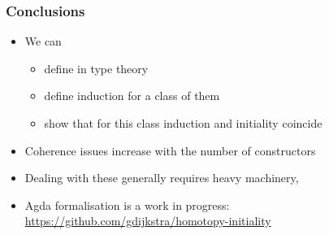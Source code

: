 \documentclass{beamer}
\begin{document}
 \begin{frame}
   \frametitle{Conclusions}
   
   \begin{itemize}
   \item We can
     \begin{itemize}
     \item define \onehits in type theory
     \item define induction for a class of them
     \item show that for this class induction and initiality coincide
     \end{itemize}
   \item Coherence issues increase with the number of constructors
   \item Dealing with these generally requires heavy machinery, \eg \omegacats
   \item Agda formalisation is a work in progress: \url{https://github.com/gdijkstra/homotopy-initiality}
   \end{itemize}

 \end{frame}
\end{document}
